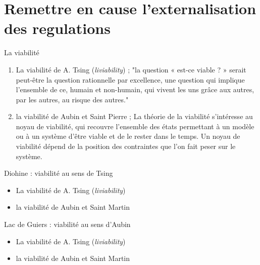\documentclass[newPxFont]{beamer}
\begin{document}

\section{Remettre en cause l'externalisation des regulations}

\begin{frame}[c]{La viabilité}
  \vspace{-1cm}
  \begin{enumerate}
    \item La viabilité de A. Tsing (\textit{liviability}) ; "la question « est-ce viable ? » serait peut-être la question rationnelle par excellence, une question qui implique l'ensemble de ce, humain et non-humain, qui vivent les uns grâce aux autres, par les autres, au risque des autres."
    \item la viabilité de Aubin et Saint Pierre ; La théorie de la viabilité s’intéresse au noyau de viabilité, qui recouvre l’ensemble des états permettant à un modèle ou à un système d’être viable et de le rester dans le temps. Un noyau de viabilité dépend de la position des contraintes que l’on fait peser sur le système.
  \end{enumerate}


\end{frame}

\begin{frame}[c]{Diohine : viabilité au sens de Tsing}
    \vspace{-1cm}
    \begin{itemize}
      \item La viabilité de A. Tsing (\textit{liviability})
      \item la viabilité de Aubin et Saint Martin
    \end{itemize}
  
  
\end{frame}

\begin{frame}[c]{Lac de Guiers : viabilité au sens  d'Aubin}
      \vspace{-1cm}
      \begin{itemize}
        \item La viabilité de A. Tsing (\textit{liviability})
        \item la viabilité de Aubin et Saint Martin
      \end{itemize}
    
    
\end{frame}
\end{document}
